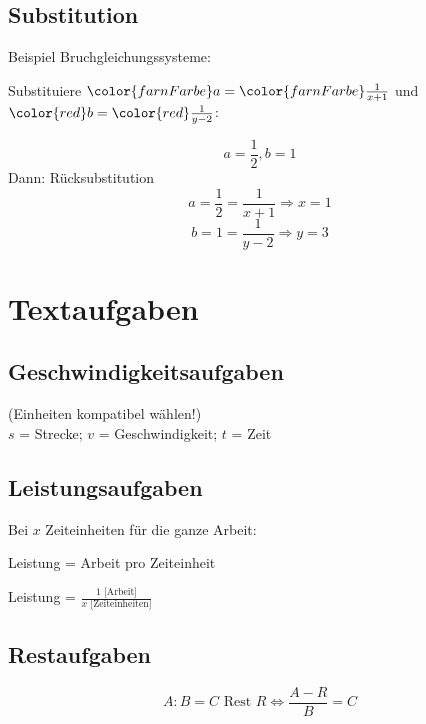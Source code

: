 \begin{multicols}{2}
\forceCB
\headerUndFooterDieseSeite{}

\subsection*{Substitution}
Beispiel Bruchgleichungssysteme:

Substituiere
${\color{farnFarbe}a}={\color{farnFarbe}\frac1{x+1}}$ und
${\color{red}b} = {\color{red}\frac1{y-2}}$:


$$a=\frac12, b=1$$
Dann: Rücksubstitution
$$a=\frac12=\frac{1}{x+1} \Longrightarrow  x=1$$
$$b=1=\frac{1}{y-2} \Longrightarrow  y=3$$



\section*{Textaufgaben}
\subsection*{Geschwindigkeitsaufgaben}
 (Einheiten kompatibel wählen!)\\
$s$ = Strecke; $v$ = Geschwindigkeit; $t$ = Zeit

\subsection*{Leistungsaufgaben}
Bei $x$ Zeiteinheiten für die ganze Arbeit:

Leistung = Arbeit pro Zeiteinheit

Leistung = $\frac{1 \textrm{ [Arbeit]}}{x \textrm{ [Zeiteinheiten]}}$


\subsection*{Restaufgaben}
$$A:B = C \textrm{ Rest } R \Leftrightarrow{}\frac{A-R}B=C$$



\end{multicols}
